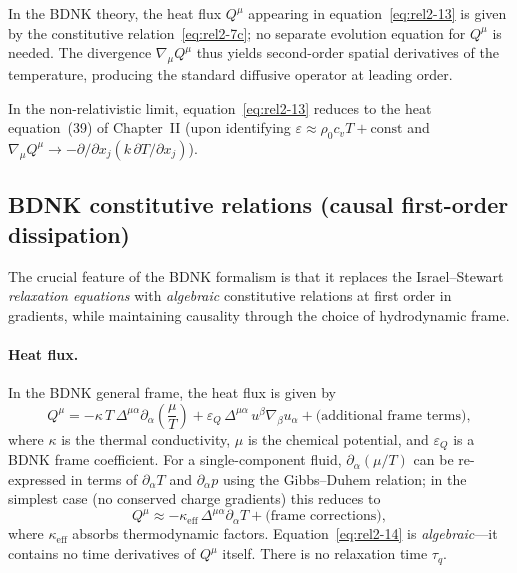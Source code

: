 In the BDNK theory, the heat flux $Q^\mu$ appearing in
equation~\eqref{eq:rel2-13} is given by the constitutive
relation~\eqref{eq:rel2-7c}; no separate evolution equation for $Q^\mu$ is
needed.  The divergence $\nabla_\mu Q^\mu$ thus yields second-order spatial
derivatives of the temperature, producing the standard diffusive operator
at leading order.

In the non-relativistic limit, equation~\eqref{eq:rel2-13} reduces to
the heat equation~(39) of Chapter~II (upon identifying
$\varepsilon \approx \rho_0 c_v T + \mathrm{const}$ and
$\nabla_\mu Q^\mu \to -\partial/\partial x_j(k\,\partial T/\partial x_j)$).

\subsection{BDNK constitutive relations (causal first-order dissipation)}%
\label{sec:rel7e}

The crucial feature of the BDNK formalism is that it replaces the
Israel--Stewart \emph{relaxation equations} with \emph{algebraic}
constitutive relations at first order in gradients, while maintaining
causality through the choice of hydrodynamic frame.

\paragraph{Heat flux.}
In the BDNK general frame, the heat flux is given by
\begin{equation}
\label{eq:rel2-14}
  Q^\mu = -\kappa\,T\,\Delta^{\mu\alpha}\partial_\alpha\!\left(\frac{\mu}{T}\right)
    + \varepsilon_Q\,\Delta^{\mu\alpha}\,u^\beta\nabla_\beta u_\alpha
    + \text{(additional frame terms)},
\end{equation}
where $\kappa$ is the thermal conductivity, $\mu$ is the chemical potential,
and $\varepsilon_Q$ is a BDNK frame coefficient.  For a single-component
fluid, $\partial_\alpha(\mu/T)$ can be re-expressed in terms of $\partial_\alpha T$
and $\partial_\alpha p$ using the Gibbs--Duhem relation; in the simplest
case (no conserved charge gradients) this reduces to
\begin{equation}
\label{eq:rel2-14b}
  Q^\mu \approx -\kappa_{\mathrm{eff}}\,\Delta^{\mu\alpha}\partial_\alpha T
    + \text{(frame corrections)},
\end{equation}
where $\kappa_{\mathrm{eff}}$ absorbs thermodynamic factors.
Equation~\eqref{eq:rel2-14} is \emph{algebraic}---it contains no time
derivatives of $Q^\mu$ itself.  There is no relaxation time $\tau_q$.

